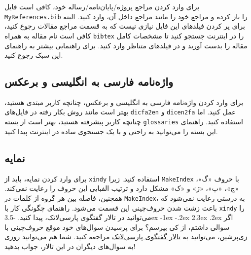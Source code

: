 \documentclass[a4paper,12pt]{article}
\makeatletter
\renewcommand\section{\@startsection {section}{1}{\z@}%
                                   {-3.5ex \@plus -1ex \@minus -.2ex}%
                                   {2.3ex \@plus.2ex}%
                                   {\normalfont\large\bfseries}}
\newcommand{\پ}{پروژه/پایان‌نامه/رساله }
\makeatother
\begin{document}
برای وارد کردن مراجع \پ خود، کافی است فایل 
\verb!MyReferences.bib!
را باز کرده و مراجع خود را مانند مراجع داخل آن، وارد کنید. البته برای پر کردن فیلدهای این فایل نیازی نیست که به قسمت مراجع مقالات رجوع کنید، کافی است نام مقاله به همراه
\verb!bibtex!
را در اینترنت جستجو کنید تا مشخصات کامل مقاله را بدست آورید و در فیلدهای متناظر وارد کنید. برای راهنمایی بیشتر به راهنمای این سبک رجوع کنید.

\subsection{واژه‌نامه فارسی به انگلیسی و برعکس}
برای وارد کردن واژه‌نامه فارسی به انگلیسی و برعکس، چنانچه کاربر مبتدی هستید، بهتر است مانند روش بکار رفته در فایل‌های 
\verb!dicfa2en!
و
\verb!dicen2fa!
عمل کنید. اما چنانچه کاربر پیشرفته هستید، بهتر است از بسته
\verb!glossaries!
استفاده کنید. راهنمای این بسته را می‌توانید به راحتی و با یک جستجوی ساده در اینترنت پیدا کنید.
\subsection{نمایه}
برای وارد کردن نمایه، باید از 
\verb!xindy!
استفاده کنید. زیرا 
\verb!MakeIndex!
با حروف «گ»، «چ»، «پ»، «ژ» و «ک» مشکل دارد و ترتیب الفبایی این حروف را رعایت نمی‌کند. همچنین، فاصله بین هر گروه از کلمات در 
\verb!MakeIndex!،
به درستی رعایت نمی‌شود که باعث زشت شدن حروف‌چینی این قسمت می‌شود. راهنمای چگونگی کار با 
\verb!xindy! 
را می‌توانید در تالار گفتگوی پارسی‌لاتک، پیدا کنید.
\section{اگر سوالی داشتم، از کی بپرسم؟}
برای پرسیدن سوال‌های خود موقع حروف‌چینی با زی‌پرشین،  می‌توانید به
 \href{http://forum.parsilatex.com}{تالار گفتگوی پارسی‌لاتک}%
مراجعه کنید. شما هم می‌توانید روزی به سوال‌های دیگران در این تالار، جواب بدهید! 
\end{document}
